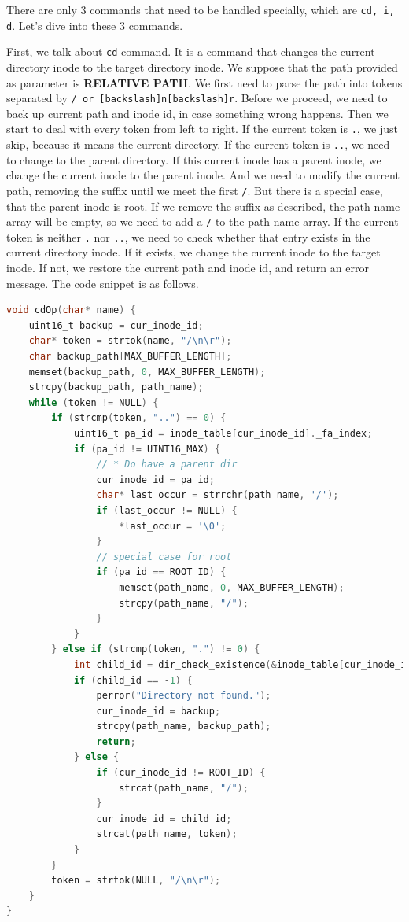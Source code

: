 There are only 3 commands that need to be handled specially, which are \texttt{cd, i, d}.
Let's dive into these 3 commands.

First, we talk about \texttt{cd} command. It is a command that changes the current directory inode to the target directory inode. We suppose that the path provided as parameter is \textbf{RELATIVE PATH}.
We first need to parse the path into tokens separated by \texttt{/ or [backslash]n[backslash]r}. Before we proceed, we need to back up current path and inode id, in case something wrong
happens. Then we start to deal with every token from left to right. If the current token is \texttt{.}, we just skip, because it means the current directory. 
If the current token is \texttt{..}, we need to change to the parent directory. If this current inode has a parent inode, we change the current inode to the parent inode. And we need to modify the current path, removing the suffix until we meet the first \texttt{/}. But 
there is a special case, that the parent inode is root. If we remove the suffix as described, the path name array will be empty, so we need to add a \texttt{/} to the path name array. If 
the current token is neither \texttt{.} nor \texttt{..}, we need to check whether that entry exists in the current directory inode. If it exists, we change the current inode to the target inode. If not, we restore the current path and inode id, and return an error message. The code snippet is as follows.

\begin{lstlisting}[language=C]
void cdOp(char* name) {
    uint16_t backup = cur_inode_id;
    char* token = strtok(name, "/\n\r");
    char backup_path[MAX_BUFFER_LENGTH];
    memset(backup_path, 0, MAX_BUFFER_LENGTH);
    strcpy(backup_path, path_name);
    while (token != NULL) {
        if (strcmp(token, "..") == 0) {
            uint16_t pa_id = inode_table[cur_inode_id]._fa_index;
            if (pa_id != UINT16_MAX) {
                // * Do have a parent dir
                cur_inode_id = pa_id;
                char* last_occur = strrchr(path_name, '/');
                if (last_occur != NULL) {
                    *last_occur = '\0';
                }
                // special case for root
                if (pa_id == ROOT_ID) {
                    memset(path_name, 0, MAX_BUFFER_LENGTH);
                    strcpy(path_name, "/");
                }
            }
        } else if (strcmp(token, ".") != 0) {
            int child_id = dir_check_existence(&inode_table[cur_inode_id], 1, token);
            if (child_id == -1) {
                perror("Directory not found.");
                cur_inode_id = backup;
                strcpy(path_name, backup_path);
                return;
            } else {
                if (cur_inode_id != ROOT_ID) {
                    strcat(path_name, "/");
                }
                cur_inode_id = child_id;
                strcat(path_name, token);
            }
        }
        token = strtok(NULL, "/\n\r");
    }
}
\end{lstlisting}

